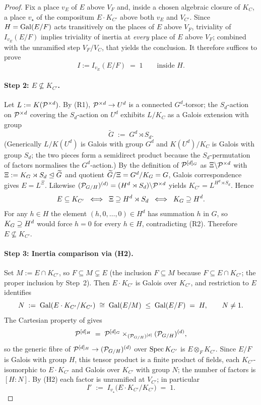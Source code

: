 \documentclass[11pt]{article}
\begin{document}
\begin{proof}
Fix a place $v_E$ of $E$ above $V_F$ and, inside a chosen algebraic closure
of $K_C$, a place $v_\star$ of the compositum $E \cdot K_{C'}$ above both
$v_E$ and $V_{C'}$.  Since $H = \operatorname{Gal}(E/F)$ acts transitively on the places
of $E$ above $V_F$, triviality of $I_{v_E}(E/F)$ implies triviality of
inertia at \emph{every} place of $E$ above $V_F$; combined with the
unramified step $V_F/V_C$, that yields the conclusion.  It therefore
suffices to prove
\[
I := I_{v_E}(E/F) \;=\; 1 \qquad \text{inside } H .
\]

\paragraph{Step 2: $E \not\subseteq K_{C'}$.}
Let $L := K(\mathcal{P}^{\times d})$.  By (R1), $\mathcal{P}^{\times d} \to U^d$ is a
connected $G^d$-torsor; the $S_d$-action on $\mathcal{P}^{\times d}$ covering the
$S_d$-action on $U^d$ exhibits $L/K_C$ as a Galois extension with group
\[
\widetilde G \;:=\; G^d \rtimes S_d .
\]
(Generically $L/K(U^d)$ is Galois with group $G^d$ and $K(U^d)/K_C$ is
Galois with group $S_d$; the two pieces form a semidirect product because
the $S_d$-permutation of factors normalises the $G^d$-action.)
By the definition of $\mathcal{P}^{[d]_G}$ as $\Xi \backslash \mathcal{P}^{\times d}$ with
$\Xi := K_{G} \rtimes S_d \trianglelefteq \widetilde G$ and quotient
$\widetilde G / \Xi = G^d/K_{G} = G$, Galois correspondence gives
$E = L^\Xi$.  Likewise
$(\mathcal{P}_{G/H})^{(d)} = (H^d \rtimes S_d) \backslash \mathcal{P}^{\times d}$ yields
$K_{C'} = L^{H^d \rtimes S_d}$.  Hence
\[
E \subseteq K_{C'}
   \;\iff\; \Xi \supseteq H^d \rtimes S_d
   \;\iff\; K_{G} \supseteq H^d .
\]
For any $h \in H$ the element $(h, 0, \dots, 0) \in H^d$ has summation $h$
in $G$, so $K_{G} \supseteq H^d$ would force $h = 0$ for every $h \in H$,
contradicting (R2).  Therefore $E \not\subseteq K_{C'}$.

\paragraph{Step 3: Inertia comparison via (H2).}
Set $M := E \cap K_{C'}$, so $F \subseteq M \subsetneq E$ (the inclusion
$F \subseteq M$ because $F \subseteq E \cap K_{C'}$; the proper inclusion
by Step~2).  Then $E \cdot K_{C'}$ is Galois over $K_{C'}$, and restriction
to $E$ identifies
\[
N \;:=\; \operatorname{Gal}(E \cdot K_{C'} / K_{C'})
   \;\cong\; \operatorname{Gal}(E/M)
   \;\leq\; \operatorname{Gal}(E/F) \;=\; H ,
\qquad N \neq 1 .
\]
The Cartesian property of  gives
\[
\mathcal{P}^{[d]_H} \;=\; \mathcal{P}^{[d]_G} \times_{(\mathcal{P}_{G/H})^{[d]}} (\mathcal{P}_{G/H})^{(d)} ,
\]
so the generic fibre of $\mathcal{P}^{[d]_H} \to (\mathcal{P}_{G/H})^{(d)}$ over
$\operatorname{Spec} K_{C'}$ is $E \otimes_F K_{C'}$.  Since $E/F$ is Galois with group
$H$, this tensor product is a finite product of fields, each
$K_{C'}$-isomorphic to $E \cdot K_{C'}$ and Galois over $K_{C'}$ with
group $N$; the number of factors is $[H : N]$.  By (H2) each factor is
unramified at $V_{C'}$; in particular
\[
I' \;:=\; I_{v_\star}\!\bigl(E \cdot K_{C'} / K_{C'}\bigr) \;=\; 1 .
\]


\end{proof}
\end{document}
